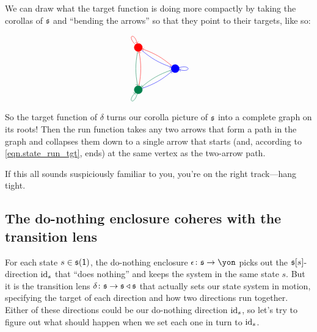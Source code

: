 \documentclass[Book-Poly]{subfiles}
\begin{document}
\begin{example}
We can draw what the target function is doing more compactly by taking the corollas of $\mathfrak{s}$ and ``bending the arrows'' so that they point to their targets, like so:
\[
\begin{tikzpicture}
    \node[circle,minimum size=2cm] (b) {};
    \foreach\x/\c in {1/red, 2/dgreen, 3/blue} {
        \node[minimum size=0.1cm,draw,circle,\c,fill=\c] (3-\x) at (b.{360/3*\x}){};
    }
    \foreach\x/\c in {1/red, 2/dgreen, 3/blue} {
        \foreach\y/\d in {1/red, 2/dgreen, 3/blue}{
            \ifnum\x=\y
                \draw[\d,->] (3-\x) to [in=360/3*\x-15,out=360/3*\x+15,loop] ();
                \relax
            \else
                \draw[\d] (3-\x) edge[->,bend right=10] (3-\y);
            \fi
        }
    }
\end{tikzpicture}
\]
So the target function of $\delta$ turns our corolla picture of $\mathfrak{s}$ into a complete graph on its roots!
Then the run function takes any two arrows that form a path in the graph and collapses them down to a single arrow that starts (and, according to \eqref{eqn.state_run_tgt}, ends) at the same vertex as the two-arrow path.

If this all sounds suspiciously familiar to you, you're on the right track---hang tight.
\end{example}

\subsection{The do-nothing enclosure coheres with the transition lens}\label{subsec.comon.sharp.state.cohere}

For each state $s\in\mathfrak{s}(\textsf{1})$, the do-nothing enclosure $\epsilon\colon\ema{s}\to\yon$ picks out the $\mathfrak{s}[s]$-direction $\mathrm{id}_s$ that ``does nothing'' and keeps the system in the same state $s$.
But it is the transition lens $\delta\colon\mathfrak{s}\to\mathfrak{s}\mathbin{\triangleleft}\mathfrak{s}$ that actually sets our state system in motion, specifying the target of each direction and how two directions run together.
Either of these directions could be our do-nothing direction $\mathrm{id}_s$, so let's try to figure out what should happen when we set each one in turn to $\mathrm{id}_s$.
\end{document}
